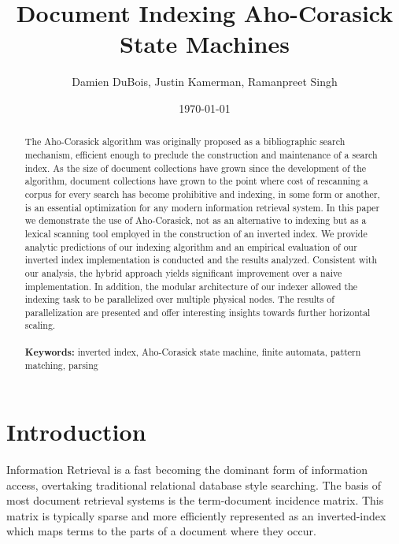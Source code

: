 \documentclass[10pt]{article}
\title{Document Indexing Aho-Corasick State Machines}
\author{Damien DuBois, Justin Kamerman, Ramanpreet Singh}
\date{\today}
\begin{document}
\maketitle

\begin{abstract}
The Aho-Corasick algorithm was originally proposed as a bibliographic
search mechanism, efficient enough to preclude the construction and
maintenance of a search index. As the size of document collections
have grown since the development of the algorithm, document
collections have grown to the point where cost of rescanning a corpus
for every search has become prohibitive and indexing, in some form or
another, is an essential optimization for any modern information
retrieval system. In this paper we demonstrate the use of
Aho-Corasick, not as an alternative to indexing but as a lexical
scanning tool employed in the construction of an inverted index. We
provide analytic predictions of our indexing algorithm and an
empirical evaluation of our inverted index implementation is conducted
and the results analyzed. Consistent with our analysis, the hybrid
approach yields significant improvement over a naive
implementation. In addition, the modular architecture of our indexer
allowed the indexing task to be parallelized over multiple physical
nodes. The results of parallelization are presented and offer
interesting insights towards further horizontal scaling.
\\\\
{\bf Keywords:} inverted index, Aho-Corasick state machine, finite
automata, pattern matching, parsing
\end{abstract}


\section{Introduction}
Information Retrieval is a fast becoming the dominant form of
information access, overtaking traditional relational database style
searching\cite{RefWorks:109}. The basis of most document retrieval systems is the
term-document incidence matrix. This matrix is typically sparse and
more efficiently represented as an inverted-index which maps terms to
the parts of a document where they occur.
\end{document}
